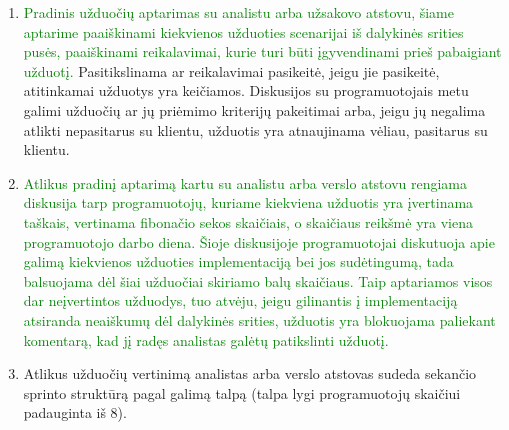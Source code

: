 \documentclass{VUMIFPSkursinis}
\begin{document}
	\begin{enumerate}
		\item{
			\textcolor{green}{Pradinis užduočių aptarimas su analistu arba užsakovo atstovu, šiame aptarime paaiškinami kiekvienos užduoties scenarijai iš dalykinės srities pusės, paaiškinami reikalavimai, kurie turi būti įgyvendinami prieš pabaigiant užduotį.}
			Pasitikslinama ar reikalavimai pasikeitė, jeigu jie pasikeitė, atitinkamai užduotys yra keičiamos.
			Diskusijos su programuotojais metu galimi užduočių ar jų priėmimo kriterijų pakeitimai arba, jeigu jų negalima atlikti nepasitarus su klientu, užduotis yra atnaujinama vėliau, pasitarus su klientu.
		}
		\item{
			\textcolor{green}{Atlikus pradinį aptarimą kartu su analistu arba verslo atstovu rengiama diskusija tarp programuotojų, kuriame kiekviena užduotis yra įvertinama taškais, vertinama fibonačio sekos skaičiais, o skaičiaus reikšmė yra viena programuotojo darbo diena.
			Šioje diskusijoje programuotojai diskutuoja apie galimą kiekvienos užduoties implementaciją bei jos sudėtingumą, tada balsuojama dėl šiai užduočiai skiriamo balų skaičiaus.
			Taip aptariamos visos dar neįvertintos užduodys, tuo atvėju, jeigu gilinantis į implementaciją atsiranda neaiškumų dėl dalykinės srities, užduotis yra blokuojama paliekant komentarą, kad jį radęs analistas galėtų patikslinti užduotį.
		}}
		\item{
			Atlikus užduočių vertinimą analistas arba verslo atstovas sudeda sekančio sprinto struktūrą pagal galimą talpą (talpa lygi programuotojų skaičiui padauginta iš 8).
		}
	\end{enumerate}
\end{document}
